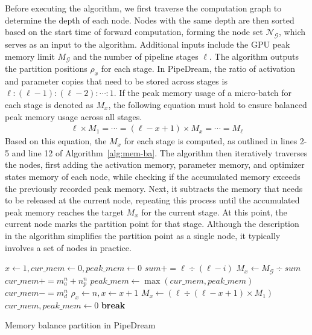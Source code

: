 Before executing the algorithm, we first traverse the computation graph to determine the depth of each node.
Nodes with the same depth are then sorted based on the start time of forward computation,
forming the node set $\mathcal{N}_\mathcal{G}$, which serves as an input to the algorithm.
Additional inputs include the GPU peak memory limit $M_\mathcal{G}$ and the number of pipeline stages $\ell$.
The algorithm outputs the partition positions $\rho_x$ for each stage.
In PipeDream, the ratio of activation and parameter copies that need to be stored across stages is
$\ell:(\ell-1):(\ell-2):\cdots:1$.
If the peak memory usage of a micro-batch for each stage is denoted as $M_x$,
the following equation must hold to ensure balanced peak memory usage across all stages.
\begin{align}
  \ell \times M_1=\cdots=(\ell-x+1) \times M_x=\cdots=M_{\ell}
\end{align}
Based on this equation, the $M_x$ for each stage is computed,
as outlined in lines 2-5 and line 12 of Algorithm~\ref{alg:mem-ba}.
The algorithm then iteratively traverses the nodes,
first adding the activation memory, parameter memory,
and optimizer states memory of each node,
while checking if the accumulated memory exceeds the previously recorded peak memory.
Next, it subtracts the memory that needs to be released at the current node,
repeating this process until the accumulated peak memory reaches the target $M_x$ for the current stage.
At this point, the current node marks the partition point for that stage.
Although the description in the algorithm simplifies the partition point as a single node,
it typically involves a set of nodes in practice.
\begin{algorithm}
  $x \leftarrow 1,cur\_mem \leftarrow 0,peak\_mem \leftarrow 0$\;
  \For{$i$ in $[0,\ell)$}
  {
    $sum += \ell \div (\ell-i)$\;
  }
  $M_x \leftarrow M_\mathcal{G} \div sum$\;
  {
    $cur\_mem += m_a^n + n_p^n$\;
    $peak\_mem \leftarrow \max(cur\_mem,peak\_mem)$\;
    $cur\_mem -= m_d^n$\;
    {
      $\rho_x \leftarrow n,x \leftarrow x + 1$\;
      $M_x \leftarrow (\ell \div (\ell -x + 1) \times M_1)$\;
      $cur\_mem, peak\_mem \leftarrow 0$\;
      {
        \textbf{break}\;
      }
    }
  }
\caption{Memory balance partition in PipeDream}
\label{alg:mem-ba}
\end{algorithm}

